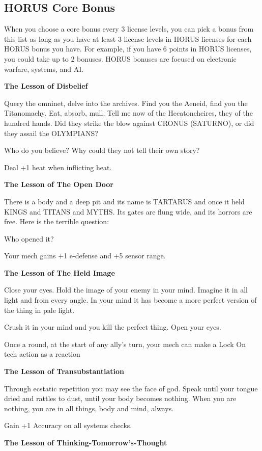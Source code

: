 \subsection{HORUS Core Bonus}

When you choose a core bonus every 3 license levels, you can pick a bonus from this list as long as you have at least 3 license levels in HORUS licenses for each HORUS bonus you have. For example, if you have 6 points in HORUS licenses, you could take up to 2 bonuses. HORUS bonuses are focused on electronic warfare, systems, and AI.

\textbf{The Lesson of Disbelief}

Query the omninet, delve into the archives. Find you the Aeneid, find you the Titanomachy. Eat, absorb, mull. Tell me now of the Hecatoncheires, they of the hundred hands. Did they strike the blow against CRONUS (SATURNO), or did they assail the OLYMPIANS?

Who do you believe? Why could they not tell their own story?

Deal +1 heat when inflicting heat.


\textbf{The Lesson of The Open Door}

There is a body and a deep pit and its name is TARTARUS and once it held KINGS and TITANS and MYTHS. Its gates are flung wide, and its horrors are free. Here is the terrible question:

Who opened it?

Your mech gains +1 e-defense and +5 sensor range.


\textbf{The Lesson of The Held Image}

Close your eyes. Hold the image of your enemy in your mind. Imagine it in all light and from every angle. In your mind it has become a more perfect version of the thing in pale light.

Crush it in your mind and you kill the perfect thing. Open your eyes.

Once a round, at the start of any ally's turn, your mech can make a Lock On tech action as a reaction


\textbf{The Lesson of Transubstantiation}

Through ecstatic repetition you may see the face of god. Speak until your tongue dried and rattles to dust, until your body becomes nothing. When you are nothing, you are in all things, body and mind, always.

Gain +1 Accuracy on all systems checks.

\textbf{The Lesson of Thinking-Tomorrow's-Thought}

